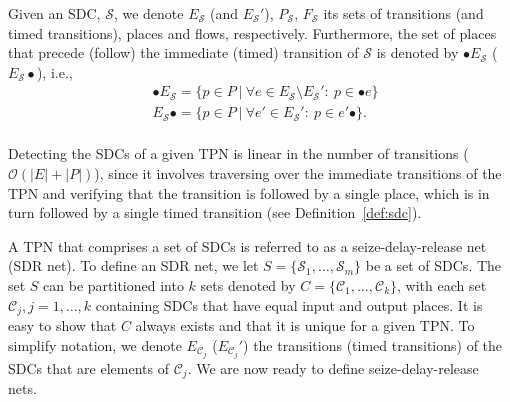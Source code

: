 Given an SDC, $\mathcal{S}$, we denote
$E_{\mathcal{S}}$ (and $E_{\mathcal{S}}'$), $P_{\mathcal{S}}$, $F_{\mathcal{S}}$ its
sets of transitions (and timed transitions), places and flows,  respectively.
Furthermore, the set of places that precede (follow) the immediate (timed) transition of $\mathcal{S}$ is denoted by 
$\bullet E_{\mathcal{S}}$ ($E_{\mathcal{S}} \bullet$), i.e., \begin{align*}
&\bullet E_{\mathcal{S}} = \{p \in P \ | \ \forall e \in E_{\mathcal{S}} \setminus E_{\mathcal{S}}': \ p \in \bullet e \} \\
&E_{\mathcal{S}} \bullet = \{p \in P \ | \ \forall e' \in E_{\mathcal{S}}' : \ p \in e'\bullet \}. \\
\end{align*}

Detecting the SDCs of a given TPN is linear in the number of transitions ($\mathcal{O}(|E|+|P|)$), since 
it involves traversing over the immediate transitions of the TPN and verifying
that the transition is followed by a single place,
which is in turn followed by 
a single timed transition (see Definition~\ref{def:sdc}).



A TPN that comprises a set of SDCs is referred to 
as a seize-delay-release net (SDR net). To define 
an SDR net, we let $S= \{\mathcal{S}_1,\ldots,\mathcal{S}_m\}$ be a set of SDCs.
The set $S$ can be partitioned into 
$k$ sets denoted by $C = \{\mathcal{C}_1,\ldots, \mathcal{C}_k\}$, 
with each set $\mathcal{C}_j, j = 1,\ldots, k$ containing 
SDCs that have equal 
input and output places. It is easy to show 
that $C$ always exists and that it is unique for 
a given TPN.
To simplify notation, we denote $E_{\mathcal{C}_j}$ ($E_{\mathcal{C}_j}'$)
the transitions (timed transitions)
of the SDCs that are elements of 
$\mathcal{C}_j$. We are now ready to define 
seize-delay-release nets.

